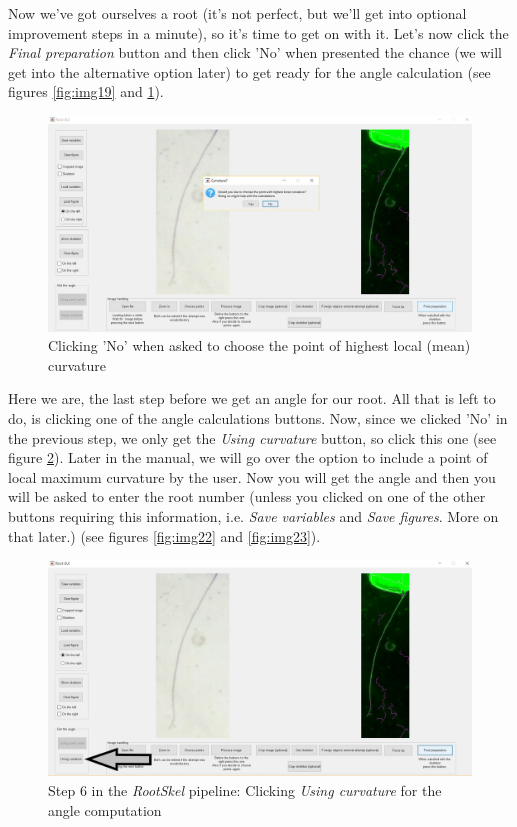 Now we've got ourselves a root (it's not perfect, but we'll get into optional improvement steps in a minute), so it's time to get on with it. 
Let's now click the \textit{Final preparation} button and then click 'No' when presented the chance (we will get into the alternative option later) to get ready for the angle calculation (see figures \ref{fig:img19} and \ref{fig:img20}).

\begin{figure}[H]
	\centering
	\includegraphics[width=\textwidth]{../Figures/manual/step17.jpg}
	\caption{Clicking 'No' when asked to choose the point of highest local (mean) curvature}
	\label{fig:img20}
\end{figure}

Here we are, the last step before we get an angle for our root. 
All that is left to do, is clicking one of the angle calculations buttons.
Now, since we clicked 'No' in the previous step, we only get the \textit{Using curvature} button, so click this one (see figure \ref{fig:img21}).
Later in the manual, we will go over the option to include a point of local maximum curvature by the user. 
Now you will get the angle and then you will be asked to enter the root number (unless you clicked on one of the other buttons requiring this information, i.e. \textit{Save variables} and \textit{Save figures}. More on that later.) (see figures \ref{fig:img22} and \ref{fig:img23}).

\begin{figure}[H]
	\centering
	\includegraphics[width=\textwidth]{../Figures/manual/step18.jpg}
	\caption{Step 6 in the \textit{RootSkel} pipeline: Clicking \textit{Using curvature} for the angle computation}
	\label{fig:img21}
\end{figure}

